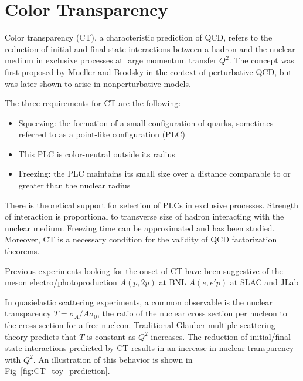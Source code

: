 \section{Color Transparency}
Color transparency (CT), a characteristic prediction of QCD, refers to the
reduction of initial and final state interactions between a hadron and the
nuclear medium in exclusive processes at large momentum transfer $Q^2$.
The concept was first proposed by Mueller and Brodsky in the context of
perturbative QCD, but was later shown to arise in nonperturbative models.


The three requirements for CT are the following:
\begin{itemize}
    \item Squeezing: the formation of a small configuration of quarks, sometimes
          referred to as a point-like configuration (PLC)
    \item This PLC is color-neutral outside its radius
    \item Freezing: the PLC maintains its small size over a distance comparable
          to or greater than the nuclear radius
\end{itemize}
There is theoretical support for selection of PLCs in exclusive processes.
Strength of interaction is proportional to transverse size of hadron interacting
with the nuclear medium.
Freezing time can be approximated and has been studied.
Moreover, CT is a necessary condition for the validity of QCD factorization
theorems.


Previous experiments looking for the onset of CT have been suggestive of the
meson electro/photoproduction
$A(p,2p)$ at BNL
$A(e,e'p)$ at SLAC and JLab


In quasielastic scattering experiments, a common observable is the nuclear
transparency $T=\sigma_A/A\sigma_0$, the ratio of the nuclear cross section per
nucleon to the cross section for a free nucleon.
Traditional Glauber multiple scattering theory predicts that $T$ is constant as
$Q^2$ increases.
The reduction of initial/final state interactions predicted by CT results in an
increase in nuclear transparency with $Q^2$.
An illustration of this behavior is shown in Fig~\ref{fig:CT_toy_prediction}.

